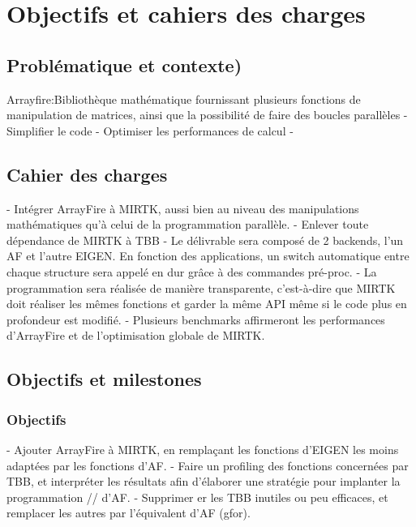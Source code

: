 \documentclass[12pt]{report}
\begin{document}
\chapter{Objectifs et cahiers des charges}
	\section{Problématique et contexte)}
	Arrayfire:Bibliothèque mathématique fournissant plusieurs fonctions de manipulation de matrices, ainsi que la possibilité de faire des boucles parallèles
	- Simplifier le code - Optimiser les performances de calcul -
	\section{Cahier des charges}
	- Intégrer ArrayFire à MIRTK, aussi bien au niveau des manipulations mathématiques qu'à celui de la programmation parallèle.
	\newline- Enlever toute dépendance de MIRTK à TBB
	\newline- Le délivrable sera composé de 2 backends, l'un AF et l'autre EIGEN. En fonction des applications, un switch automatique entre chaque structure sera appelé en dur grâce à des commandes pré-proc.
	\newline- La programmation sera réalisée de manière transparente, c'est-à-dire que MIRTK doit réaliser les mêmes fonctions et garder la même API même si le code plus en profondeur est modifié.
	\newline- Plusieurs benchmarks affirmeront les performances d'ArrayFire et de l'optimisation globale de MIRTK.
	\section{Objectifs et milestones}
	\subsection{Objectifs}- Ajouter ArrayFire à MIRTK, en remplaçant les fonctions d'EIGEN les moins adaptées par les fonctions d'AF. \newline
	- Faire un profiling des fonctions concernées par TBB, et interpréter les résultats afin d'élaborer une stratégie pour implanter la programmation // d'AF.\newline
	- Supprimer er les TBB inutiles ou peu efficaces, et remplacer les autres par l'équivalent d'AF (gfor).\newline
	
	
\end{document}
